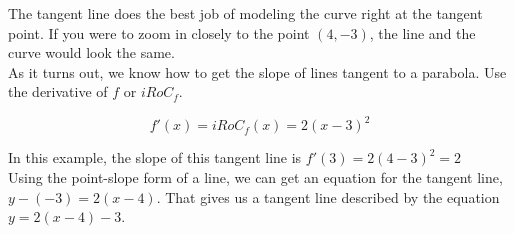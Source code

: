 \documentclass{ximera}
\begin{document}
\begin{image}
\end{image}



The tangent line does the best job of modeling the curve right at the tangent point. If you were to zoom in closely to the point $(4, -3)$, the line and the curve would look the same.\\


As it turns out, we know how to get the slope of lines tangent to a parabola.  Use the derivative of $f$ or $iRoC_f$.   

\[ 
f'(x)=iRoC_f(x) = 2 (x - 3)^2
\] 

In this example, the slope of this tangent line is $f'(3) = 2 (4-3)^2 = 2$ \\

Using the point-slope form of a line, we can get an equation for the tangent line, $y - (-3)=2 (x-4)$. That gives us a tangent line described by the equation $y = 2 (x - 4) - 3$.
\end{document}
